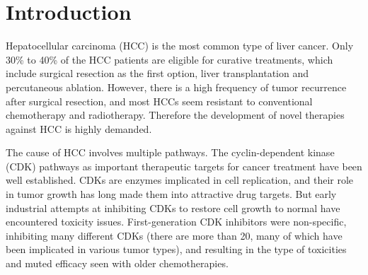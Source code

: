 \documentclass[10pt,letterpaper]{article}
\begin{document}

\linenumbers

\section*{Introduction}

Hepatocellular carcinoma (HCC) is the most common type of liver cancer. Only 30\% to 40\% of the HCC patients are eligible for curative treatments, which include surgical resection as the first option, liver transplantation and percutaneous ablation. However, there is a high frequency of tumor recurrence after surgical resection, and most HCCs seem resistant to conventional chemotherapy and radiotherapy. Therefore the development of novel therapies against HCC is highly demanded.

The cause of HCC involves multiple pathways. The cyclin-dependent kinase (CDK) pathways as important therapeutic targets for cancer treatment have been well established. CDKs are enzymes implicated in cell replication, and their role in tumor growth has long made them into attractive drug targets. But early industrial attempts at inhibiting CDKs to restore cell growth to normal have encountered toxicity issues. First-generation CDK inhibitors were non-specific, inhibiting many different CDKs (there are more than 20, many of which have been implicated in various tumor types), and resulting in the type of toxicities and muted efficacy seen with older chemotherapies.
\end{document}
